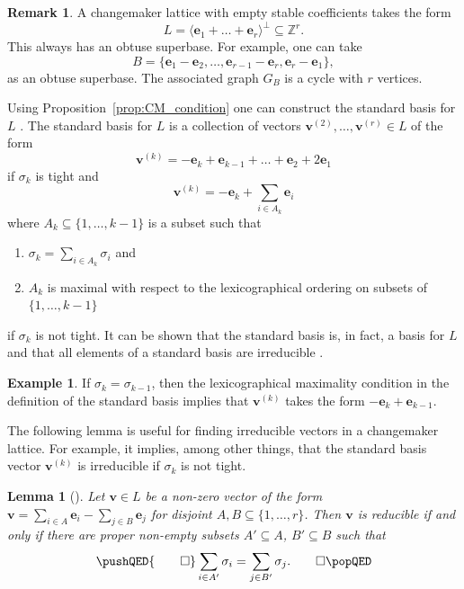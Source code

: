 \documentclass{amsart} %
\newcommand{\Z}{\mathbb{Z}}
\newcommand{\e}{\bm{e}}
\newcommand{\bv}{\bm{v}}
\theoremstyle{thm}
\newtheorem{lem}[Theorem]{Lemma}
\theoremstyle{definition}
\newtheorem{rem}[Theorem]{Remark}
\newtheorem{ex}[Theorem]{Example}
\numberwithin{equation}{section}
\begin{document}
\begin{rem}\label{rem:empty_coefs_examples}
A changemaker lattice with empty stable coefficients takes the form
\[
L=\langle \e_1 + \dots + \e_r \rangle^\bot\subseteq \Z^r.
\]
This always has an obtuse superbase. For example, one can take
\[
B=\{\e_1-\e_2, \dots, \e_{r-1}-\e_r, \e_r-\e_1\},
\]
as an obtuse superbase. The associated graph $G_B$ is a cycle with $r$ vertices.
\end{rem}

Using Proposition~\ref{prop:CM_condition} one can construct the standard basis for $L$ \cite{GreeneLRP}. The standard basis for $L$ is a collection of vectors $\bv^{(2)}, \dots, \bv^{(r)}\in L$ of the form
\[
\bv^{(k)}=-\e_k + \e_{k-1}+\dots + \e_2 + 2\e_1
\]
if $\sigma_k$ is tight and
\[
\bv^{(k)}=-\e_k + \sum_{i\in A_k} \e_i
\]
where $A_k\subseteq \{1,\dots, k-1\}$ is a subset such that
\begin{enumerate}
    \item[(i)] $\sigma_k=\sum_{i\in A_k} \sigma_i$ and
    \item[(ii)] $A_k$ is maximal with respect to the lexicographical ordering on subsets of $\{1,\dots, k-1\}$
\end{enumerate}
 if $\sigma_k$ is not tight. It can be shown that the standard basis is, in fact, a basis for $L$ and that all elements of a standard basis are irreducible \cite[Lemma~3.13]{GreeneLRP}. 
\begin{ex}
    If $\sigma_k=\sigma_{k-1}$, then the lexicographical maximality condition in the definition of the standard basis implies that $\bv^{(k)}$ takes the form $-\e_k+\e_{k-1}$.
\end{ex}

The following lemma is useful for finding irreducible vectors in a changemaker lattice. For example, it implies, among other things, that the standard basis vector $\bv^{(k)}$ is irreducible if $\sigma_k$ is not tight.
\begin{lem}[{\cite[Proposition 4.11]{Mc16}}]
\label{lem:irred_examples}
Let $\bv \in L$ be a non-zero vector of the form $\bv=\sum_{i\in A} \e_i -\sum_{j\in B} \e_j$ for disjoint $A,B \subseteq \{1, \dots, r\}$. Then $\bv$ is reducible if and only if there are proper non-empty subsets $A'\subseteq A$, $B'\subseteq B$ such that
\[
\pushQED{\qed} 
\sum_{i\in A'}\sigma_i =\sum_{j\in B'} \sigma_j.\qedhere
\popQED
\]
\end{lem}
\end{document}
